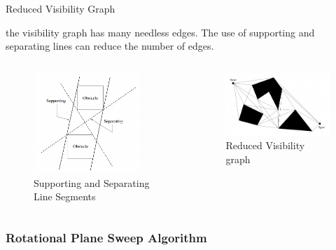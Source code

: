 \documentclass[handout]{beamer}
\begin{document}
  \begin{frame}{Reduced Visibility Graph}

  the visibility graph has many needless edges. The use of supporting and separating lines can reduce the number of edges.

    \begin{columns}
      \begin{column}[]{0.4\textwidth}
        \begin{center}
          \begin{figure}
            \includegraphics[width=40mm]{fig/fig_04_supporting_separating_segments.png}
            \caption{Supporting and Separating Line Segments}
            \label{fig:fig04}
          \end{figure}
         \end{center}
      \end{column}
      \begin{column}[]{0.6\textwidth}
        \begin{center}
        \begin{figure}
          \includegraphics[width=60mm]{fig/fig_05_reduced_visibility_graph.png}
          \caption{Reduced Visibility graph}
          \label{fig:fig05}
        \end{figure}
       \end{center}
      \end{column}
    \end{columns}
    
  \end{frame}

  \begin{frame}
    \frametitle{Rotational Plane Sweep Algorithm}
  
    
  
  \end{frame}
\end{document}
